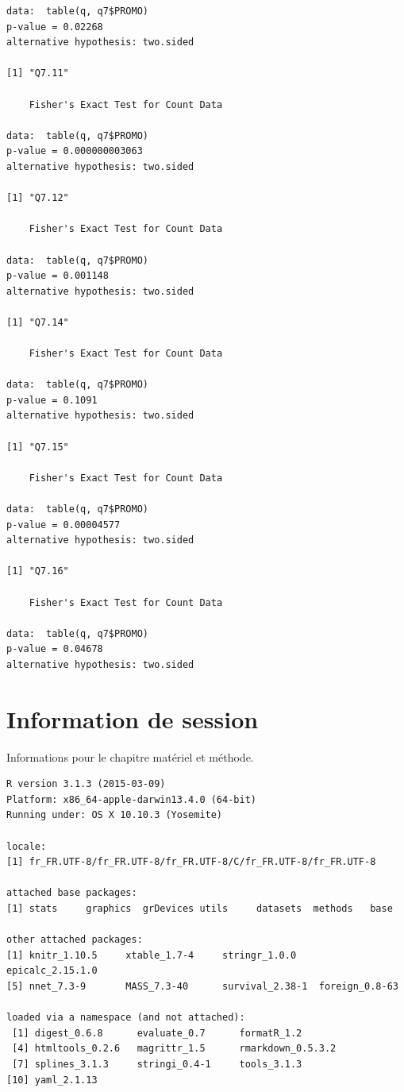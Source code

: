 \documentclass[]{article}
\begin{document}
\begin{verbatim}
data:  table(q, q7$PROMO)
p-value = 0.02268
alternative hypothesis: two.sided

[1] "Q7.11"

    Fisher's Exact Test for Count Data

data:  table(q, q7$PROMO)
p-value = 0.000000003063
alternative hypothesis: two.sided

[1] "Q7.12"

    Fisher's Exact Test for Count Data

data:  table(q, q7$PROMO)
p-value = 0.001148
alternative hypothesis: two.sided

[1] "Q7.14"

    Fisher's Exact Test for Count Data

data:  table(q, q7$PROMO)
p-value = 0.1091
alternative hypothesis: two.sided

[1] "Q7.15"

    Fisher's Exact Test for Count Data

data:  table(q, q7$PROMO)
p-value = 0.00004577
alternative hypothesis: two.sided

[1] "Q7.16"

    Fisher's Exact Test for Count Data

data:  table(q, q7$PROMO)
p-value = 0.04678
alternative hypothesis: two.sided
\end{verbatim}

\section{Information de session}\label{information-de-session}

Informations pour le chapitre matériel et méthode.

\begin{verbatim}
R version 3.1.3 (2015-03-09)
Platform: x86_64-apple-darwin13.4.0 (64-bit)
Running under: OS X 10.10.3 (Yosemite)

locale:
[1] fr_FR.UTF-8/fr_FR.UTF-8/fr_FR.UTF-8/C/fr_FR.UTF-8/fr_FR.UTF-8

attached base packages:
[1] stats     graphics  grDevices utils     datasets  methods   base     

other attached packages:
[1] knitr_1.10.5     xtable_1.7-4     stringr_1.0.0    epicalc_2.15.1.0
[5] nnet_7.3-9       MASS_7.3-40      survival_2.38-1  foreign_0.8-63  

loaded via a namespace (and not attached):
 [1] digest_0.6.8      evaluate_0.7      formatR_1.2      
 [4] htmltools_0.2.6   magrittr_1.5      rmarkdown_0.5.3.2
 [7] splines_3.1.3     stringi_0.4-1     tools_3.1.3      
[10] yaml_2.1.13      
\end{verbatim}
\end{document}
